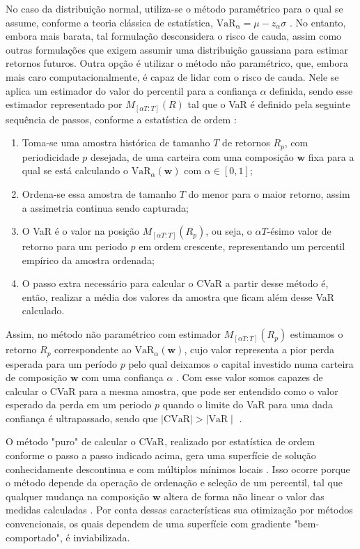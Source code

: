 \documentclass[12pt,a4paper]{article}
\begin{document}
 No caso da distribuição normal, utiliza-se o método paramétrico para o qual se assume, conforme a teoria clássica de estatística, $\mathrm{VaR_\alpha} = \mu-z_{\alpha}\sigma$ \cite{barrosa2015aplicacao}. No entanto, embora mais barata, tal formulação desconsidera o risco de cauda, assim como outras formulações que exigem assumir uma distribuição gaussiana para estimar retornos futuros. Outra opção é utilizar o método não paramétrico, que, embora mais caro computacionalmente, é capaz de lidar com o risco de cauda. Nele se aplica um estimador do valor do percentil para a confiança $\alpha$ definida, sendo esse estimador representado por $M_{[\alpha T:T]}(R)$ tal que o VaR é definido pela seguinte sequência de passos, conforme a estatística de ordem \cite{barrosa2015aplicacao}:
 \begin{enumerate}
     \item Toma-se uma amostra histórica de tamanho $T$ de retornos $R_p$, com periodicidade $p$ desejada, de uma carteira com uma composição $\mathbf{w}$ fixa para a qual se está calculando o $\mathrm{VaR}_\alpha(\mathbf{w})$ com $\alpha \in [0,1]$;
     \item Ordena-se essa amostra de tamanho $T$ do menor para o maior retorno, assim a assimetria continua sendo capturada;
     \item O VaR é o valor na posição $M_{[\alpha T:T]}(R_p)$, ou seja, o $\alpha T$-ésimo valor de retorno para um periodo $p$ em ordem crescente, representando um percentil empírico da amostra ordenada;
     \item O passo extra necessário para calcular o CVaR a partir desse método é, então, realizar a média dos valores da amostra que ficam além desse VaR calculado.
 \end{enumerate}
 Assim, no método não paramétrico com estimador $M_{[\alpha T:T]}(R_p)$ estimamos o retorno $R_p$ correspondente ao $\mathrm{VaR}_\alpha(\mathbf{w})$, cujo valor representa a pior perda esperada para um período $p$ pelo qual deixamos o capital investido numa carteira de composição $\mathbf{w}$ com uma confiança $\alpha$ \cite{barrosa2015aplicacao}. Com esse valor somos capazes de calcular o CVaR para a mesma amostra, que pode ser entendido como o valor esperado da perda em um periodo $p$ quando o limite do VaR para uma dada confiança é ultrapassado, sendo que $\mid\mathrm{CVaR}\mid > \mid\mathrm{VaR}\mid$ \cite{barrosa2015aplicacao}. 

 O método "puro" de calcular o CVaR, realizado por estatística de ordem conforme o passo a passo indicado acima, gera uma superfície de solução conhecidamente descontinua e com múltiplos mínimos locais \cite{rockafellar2000optimization}. Isso ocorre porque o método depende da operação de ordenação e seleção de um percentil, tal que qualquer mudança na composição $\mathbf{w}$ altera de forma não linear o valor das medidas calculadas \cite{barrosa2015aplicacao}. Por conta dessas características sua otimização por métodos convencionais, os quais dependem de uma superfície com gradiente "bem-comportado", é inviabilizada.
\end{document}
